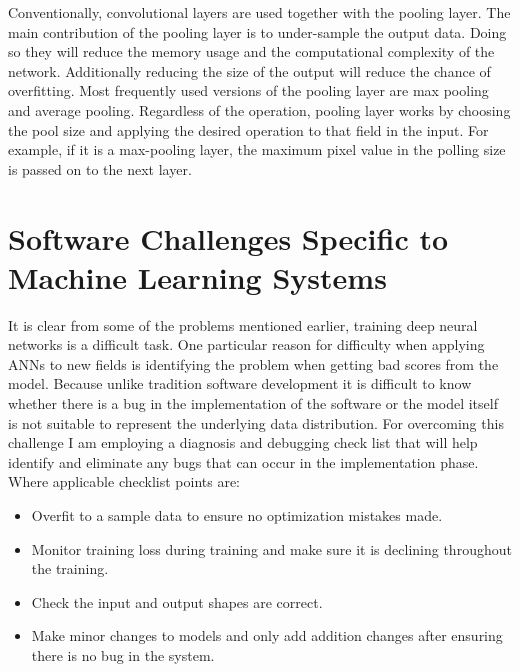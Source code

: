 Conventionally, convolutional layers are used together with the pooling layer.
The main contribution of the pooling layer is to under-sample the output data.
Doing so they will reduce the memory usage and the computational complexity of the network.
Additionally reducing the size of the output will reduce the chance of overfitting.
Most frequently used versions of the pooling layer are max pooling and average pooling.
Regardless of the operation, pooling layer works by choosing the pool size and applying the desired operation to that field in the input.
For example, if it is a max-pooling layer, the maximum pixel value in the polling size is passed on to the next layer.


\section{Software Challenges Specific to 
Machine Learning Systems} \label{sec:engchallenge}
It is clear from some of the problems mentioned earlier, training deep neural networks is a difficult task. 
One particular reason for difficulty when applying ANNs to new fields is identifying the problem when getting bad scores from the model. 
Because unlike tradition software development it is difficult to know whether there is a bug in the implementation of the software or the model itself is not suitable to represent the underlying data distribution.
For overcoming this challenge I am employing a diagnosis and debugging check list that will help identify and eliminate any bugs that can occur in the implementation phase.
Where applicable checklist points are:

\begin{itemize}
  \item Overfit to a sample data to ensure no optimization mistakes made.
  \item Monitor training loss during training and make sure it is declining throughout the training.
  \item Check the input and output shapes are correct.
  \item Make minor changes to models and only add addition changes after ensuring there is no bug in the system.
\end{itemize}

